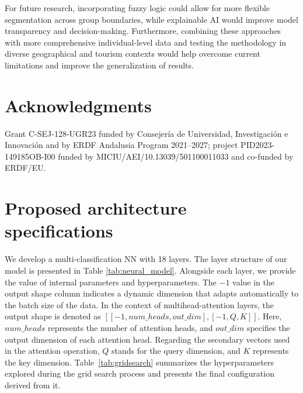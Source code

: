 \documentclass{ws-ijitdm}
\begin{document}
{\color{black} For future research, incorporating fuzzy logic could allow for more flexible segmentation across group boundaries, while explainable AI would improve model transparency and decision-making. Furthermore, combining these approaches with more comprehensive individual-level data and testing the methodology in diverse geographical and tourism contexts would help overcome current limitations and improve the generalization of results.}


\section*{Acknowledgments}

Grant C-SEJ-128-UGR23 funded by Consejería de Universidad, Investigación e Innovación and by ERDF Andalusia Program 2021–2027; project PID2023-149185OB-I00 funded by MICIU/AEI/10.13039/501100011033 and co-funded by ERDF/EU.

\appendix

{\color{black}
\section{Proposed architecture specifications}
\label{ap:nn}
}

We develop a multi-classification NN with 18 layers. The layer structure of our model is presented in Table \ref{tab:neural_model}. Alongside each layer, we provide the value of internal parameters and hyperparameters. The $-1$ value in the output shape column indicates a dynamic dimension that adapts automatically to the batch size of the data. In the context of multihead-attention layers, the output shape is denoted as $[[-1,num\_heads,out\_dim],[-1,Q,K]]$. Here, $num\_heads$ represents the number of attention heads, and $out\_dim$ specifies the output dimension of each attention head. Regarding the secondary vectors used in the attention operation, $Q$ stands for the query dimension, and $K$ represents the key dimension.  {\color{black}Table~\ref{tab:gridsearch} summarizes the hyperparameters explored during the grid search process and presents the final configuration derived from it.}
\end{document}
